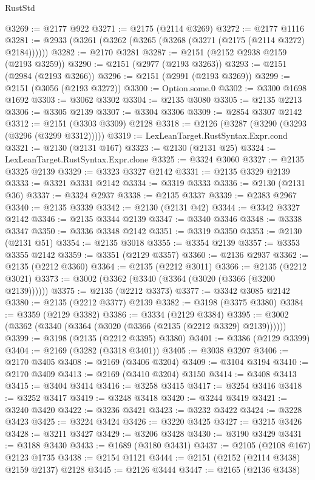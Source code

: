 \begin{lexlean}{RustStd}
\begin{coremodule}
{\begin{coremodule}
{{{{{{{{{{{{{{{{@3269 := @2177 @922
@3271 := @2175 (@2114 @3269)
@3272 := @2177 @1116
@3281 := @2933 (@3261 (@3262 (@3265 (@3268 (@3271 (@2175 (@2114 @3272) @2184))))))
@3282 := @2170 @3281
@3287 := @2151 (@2152 @2938 @2159 (@2193 @3259))
@3290 := @2151 (@2977 (@2193 @3263))
@3293 := @2151 (@2984 (@2193 @3266))
@3296 := @2151 (@2991 (@2193 @3269))
@3299 := @2151 (@3056 (@2193 @3272))
@3300 := Option.some.{0}
@3302 := @3300 @1698 @1692
@3303 := @3062 @3302
@3304 := @2135 @3080
@3305 := @2135 @2213
@3306 := @3305 @2139
@3307 := @3304 @3306
@3309 := @2854 @3307 @2142
@3312 := @2151 (@3303 @3309) @2128
@3318 := @2126 (@3287 (@3290 (@3293 (@3296 (@3299 @3312)))))
@3319 := LexLeanTarget.RustSyntax.Expr.cond
@3321 := @2130 (@2131 @167)
@3323 := @2130 (@2131 @25)
@3324 := LexLeanTarget.RustSyntax.Expr.clone
@3325 := @3324 @3060
@3327 := @2135 @3325 @2139
@3329 := @3323 @3327 @2142
@3331 := @2135 @3329 @2139
@3333 := @3321 @3331 @2142
@3334 := @3319 @3333
@3336 := @2130 (@2131 @36)
@3337 := @3324 @2937
@3338 := @2135 @3337
@3339 := @2383 @2967
@3340 := @2135 @3339
@3342 := @2130 (@2131 @42)
@3344 := @3342 @3327 @2142
@3346 := @2135 @3344 @2139
@3347 := @3340 @3346
@3348 := @3338 @3347
@3350 := @3336 @3348 @2142
@3351 := @3319 @3350
@3353 := @2130 (@2131 @51)
@3354 := @2135 @3018
@3355 := @3354 @2139
@3357 := @3353 @3355 @2142
@3359 := @3351 (@2129 @3357)
@3360 := @2136 @2937
@3362 := @2135 (@2212 @3360)
@3364 := @2135 (@2212 @3011)
@3366 := @2135 (@2212 @3021)
@3373 := @3002 (@3362 (@3340 (@3364 (@3020 (@3366 (@3200 @2139))))))
@3375 := @2135 (@2212 @3373)
@3377 := @3342 @3085 @2142
@3380 := @2135 (@2212 @3377) @2139
@3382 := @3198 (@3375 @3380)
@3384 := @3359 (@2129 @3382)
@3386 := @3334 (@2129 @3384)
@3395 := @3002 (@3362 (@3340 (@3364 (@3020 (@3366 (@2135 (@2212 @3329) @2139))))))
@3399 := @3198 (@2135 (@2212 @3395) @3380)
@3401 := @3386 (@2129 @3399)
@3404 := @2169 (@3282 (@3318 @3401))
@3405 := @3038 @3207
@3406 := @2170 @3405
@3408 := @2169 (@3406 @3204)
@3409 := @3104 @3194
@3410 := @2170 @3409
@3413 := @2169 (@3410 @3204) @3150
@3414 := @3408 @3413
@3415 := @3404 @3414
@3416 := @3258 @3415
@3417 := @3254 @3416
@3418 := @3252 @3417
@3419 := @3248 @3418
@3420 := @3244 @3419
@3421 := @3240 @3420
@3422 := @3236 @3421
@3423 := @3232 @3422
@3424 := @3228 @3423
@3425 := @3224 @3424
@3426 := @3220 @3425
@3427 := @3215 @3426
@3428 := @3211 @3427
@3429 := @3206 @3428
@3430 := @3190 @3429
@3431 := @3188 @3430
@3433 := @1689 (@3180 @3431)
@3437 := @2105 (@2108 @167) @2123 @1735
@3438 := @2154 @1121
@3444 := @2151 (@2152 (@2114 @3438) @2159 @2137) @2128
@3445 := @2126 @3444
@3447 := @2165 (@2136 @3438)
}}}}}}}}}}}}}}}}
\end{coremodule}}
\end{coremodule}
\end{lexlean}
